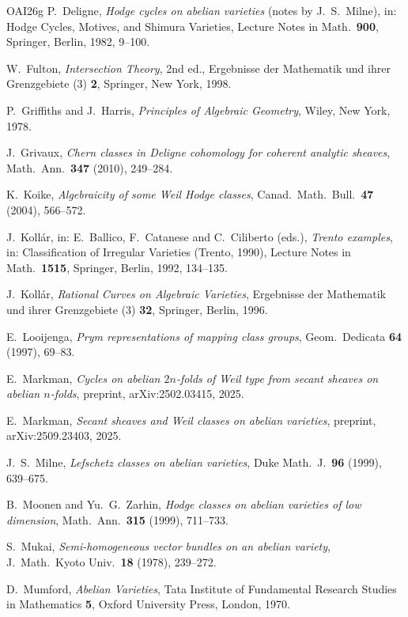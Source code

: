 \begin{thebibliography}{OAI26g}
P.~Deligne, \emph{Hodge cycles on abelian varieties} (notes by
J.~S.~Milne), in: Hodge Cycles, Motives, and Shimura Varieties, Lecture
Notes in Math.\ \textbf{900}, Springer, Berlin, 1982, 9--100.

W.~Fulton, \emph{Intersection Theory}, 2nd ed., Ergebnisse der Mathematik
und ihrer Grenzgebiete (3) \textbf{2}, Springer, New York, 1998.

P.~Griffiths and J.~Harris, \emph{Principles of Algebraic Geometry}, Wiley,
New York, 1978.

J.~Grivaux, \emph{Chern classes in Deligne cohomology for coherent analytic
sheaves}, Math.\ Ann.\ \textbf{347} (2010), 249--284.

K.~Koike, \emph{Algebraicity of some Weil Hodge classes}, Canad.\ Math.\
Bull.\ \textbf{47} (2004), 566--572.

J.~Koll\'ar, in: E.~Ballico, F.~Catanese and C.~Ciliberto (eds.),
\emph{Trento examples}, in: Classification of Irregular Varieties (Trento,
1990), Lecture Notes in Math.\ \textbf{1515}, Springer, Berlin, 1992,
134--135.

J.~Koll\'ar, \emph{Rational Curves on Algebraic Varieties}, Ergebnisse der
Mathematik und ihrer Grenzgebiete (3) \textbf{32}, Springer, Berlin, 1996.

E.~Looijenga, \emph{Prym representations of mapping class groups}, Geom.\
Dedicata \textbf{64} (1997), 69--83.

E.~Markman, \emph{Cycles on abelian $2n$-folds of Weil type from secant
sheaves on abelian $n$-folds}, preprint, arXiv:2502.03415, 2025.

\bibitem[Mar25b]{Mar25b}
E.~Markman, \emph{Secant sheaves and Weil classes on abelian varieties},
preprint, arXiv:2509.23403, 2025.

J.~S.~Milne, \emph{Lefschetz classes on abelian varieties}, Duke Math.\ J.\
\textbf{96} (1999), 639--675.

\bibitem[MZ99]{MZ99}
B.~Moonen and Yu.~G.~Zarhin, \emph{Hodge classes on abelian varieties of
low dimension}, Math.\ Ann.\ \textbf{315} (1999), 711--733.

\bibitem[Muk78]{Muk78}
S.~Mukai, \emph{Semi-homogeneous vector bundles on an abelian variety},
J.\ Math.\ Kyoto Univ.\ \textbf{18} (1978), 239--272.

\bibitem[Mum70]{Mum70}
D.~Mumford, \emph{Abelian Varieties}, Tata Institute of Fundamental
Research Studies in Mathematics \textbf{5}, Oxford University Press,
London, 1970.


\end{thebibliography}
